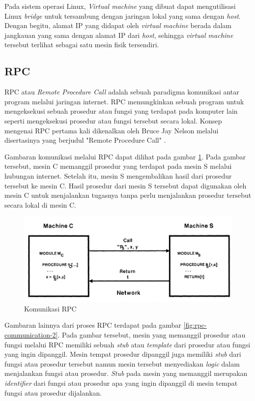 Pada sistem operasi Linux, \emph{Virtual machine} yang dibuat dapat mengutilisasi Linux
\emph{bridge} untuk tersambung dengan jaringan lokal yang sama dengan \emph{host}.
Dengan begitu, alamat IP yang didapat oleh \emph{virtual machine} berada dalam jangkauan
yang sama dengan alamat IP dari \emph{host}, sehingga \emph{virtual machine} tersebut
terlihat sebagai satu mesin fisik tersendiri.

\subsection{RPC}

RPC atau \emph{Remote Procedure Call} adalah sebuah paradigma komunikasi antar program
melalui jaringan internet. RPC memungkinkan sebuah program untuk mengeksekusi sebuah
prosedur atau fungsi yang terdapat pada komputer lain seperti mengeksekusi prosedur
atau fungsi tersebut secara lokal. Konsep mengenai RPC pertama kali dikenalkan oleh
Bruce Jay Nelson melalui disertasinya yang berjudul "Remote Procedure Call" \parencite{rpc}.

Gambaran komunikasi melalui RPC dapat dilihat pada gambar \ref{fig:rpc-communication}.
Pada gambar tersebut, mesin C memanggil prosedur yang terdapat pada mesin S melalui
hubungan internet. Setelah itu, mesin S mengembalikan hasil dari prosedur tersebut
ke mesin C. Hasil prosedur dari mesin S tersebut dapat digunakan oleh
mesin C untuk menjalankan tugasnya tanpa perlu menjalankan prosedur tersebut
secara lokal di mesin C.

\begin{figure}[H]
  \centering
  \includegraphics[scale=0.3]{gambar/rpc-communication.png}
  \caption{Komunikasi RPC \parencite{rpc}}
  \label{fig:rpc-communication}
\end{figure}

Gambaran lainnya dari proses RPC terdapat pada gambar \ref{fig:rpc-communication-2}.
Pada gambar tersebut, mesin yang memanggil prosedur atau fungsi melalui RPC memiliki sebuah
\emph{stub} atau \emph{template} dari prosedur atau fungsi yang ingin dipanggil. Mesin
tempat prosedur dipanggil juga memiliki \emph{stub} dari fungsi atau prosedur tersebut namun
mesin tersebut menyediakan \emph{logic} dalam menjalankan fungsi atau prosedur. \emph{Stub}
pada mesin yang memanggil merupakan \emph{identifier} dari fungsi atau prosedur apa yang ingin
dipanggil di mesin tempat fungsi atau prosedur dijalankan.

